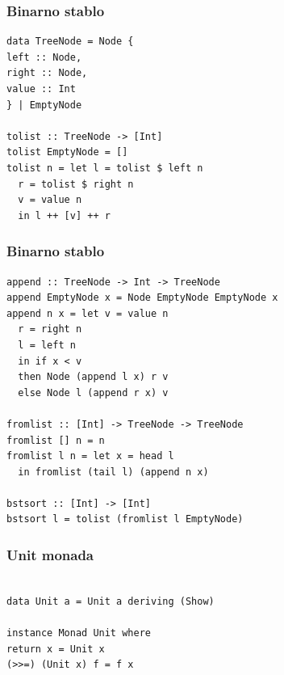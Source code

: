 \documentclass{beamer}
\begin{document}
\begin{frame}[fragile]
  \frametitle{Binarno stablo}
  \begin{lstlisting}
data TreeNode = Node {
left :: Node,
right :: Node,
value :: Int
} | EmptyNode

tolist :: TreeNode -> [Int]
tolist EmptyNode = []
tolist n = let l = tolist $ left n
  r = tolist $ right n
  v = value n
  in l ++ [v] ++ r
  \end{lstlisting}
\end{frame}

\begin{frame}[fragile]
  \frametitle{Binarno stablo}
  \begin{lstlisting}
append :: TreeNode -> Int -> TreeNode
append EmptyNode x = Node EmptyNode EmptyNode x
append n x = let v = value n
  r = right n
  l = left n
  in if x < v 
  then Node (append l x) r v 
  else Node l (append r x) v

fromlist :: [Int] -> TreeNode -> TreeNode
fromlist [] n = n
fromlist l n = let x = head l
  in fromlist (tail l) (append n x)

bstsort :: [Int] -> [Int]
bstsort l = tolist (fromlist l EmptyNode)
  \end{lstlisting}
\end{frame}



\begin{frame}[fragile]
  \frametitle{Unit monada}
  \begin{lstlisting}

data Unit a = Unit a deriving (Show)

instance Monad Unit where 
return x = Unit x
(>>=) (Unit x) f = f x
  \end{lstlisting}
\end{frame}
  
\end{document}
